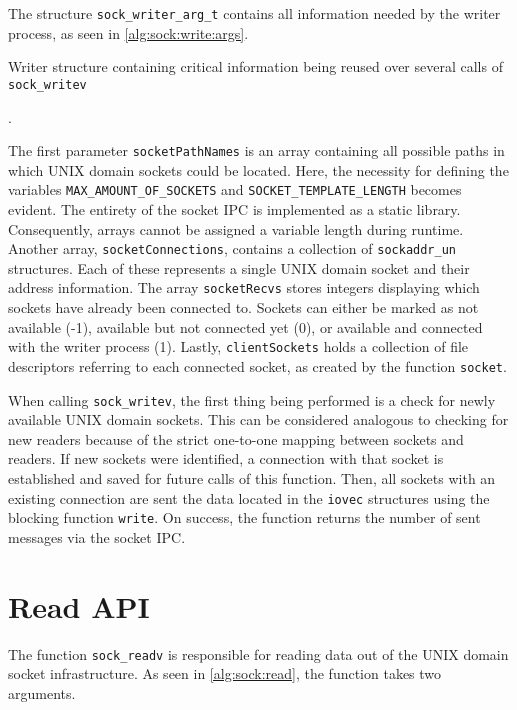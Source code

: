The structure \texttt{sock\_writer\_arg\_t} contains all information needed by the writer process, as seen in \ref{alg:sock:write:args}.

\begin{algorithm}[h!]
    
    \caption[Socket: Writer structure]{Writer structure containing critical information being reused over several calls of \texttt{sock\_writev}}.
    \label{alg:sock:write:args}
\end{algorithm}

The first parameter \texttt{socketPathNames} is an array containing all possible paths in which UNIX domain sockets could be located.
Here, the necessity for defining the variables \texttt{MAX\_AMOUNT\_OF\_SOCKETS} and \texttt{SOCKET\_TEMPLATE\_LENGTH} becomes evident.
The entirety of the socket \ac{IPC} is implemented as a static library.
Consequently, arrays cannot be assigned a variable length during runtime.
Another array, \texttt{socketConnections}, contains a collection of \texttt{sockaddr\_un} structures.
Each of these represents a single UNIX domain socket and their address information.
The array \texttt{socketRecvs} stores integers displaying which sockets have already been connected to.
Sockets can either be marked as not available (-1), available but not connected yet (0), or available and connected with the writer process (1).
Lastly, \texttt{clientSockets} holds a collection of file descriptors referring to each connected socket, as created by the function \texttt{socket}.

When calling \texttt{sock\_writev}, the first thing being performed is a check for newly available UNIX domain sockets.
This can be considered analogous to checking for new readers because of the strict one-to-one mapping between sockets and readers.
If new sockets were identified, a connection with that socket is established and saved for future calls of this function.
Then, all sockets with an existing connection are sent the data located in the \texttt{iovec} structures using the blocking function \texttt{write}.
On success, the function returns the number of sent messages via the socket \ac{IPC}.

\section{Read \ac{API}}
\label{cha:ReadAPI}
The function \texttt{sock\_readv} is responsible for reading data out of the UNIX domain socket infrastructure.
As seen in \ref{alg:sock:read}, the function takes two arguments.

